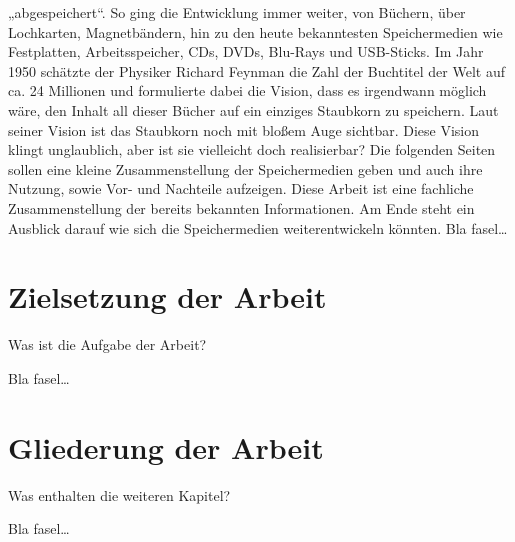 „abgespeichert“.  
So ging die Entwicklung immer weiter, von Büchern,  über Lochkarten, Magnetbändern, hin zu den heute 
bekanntesten Speichermedien wie Festplatten, Arbeitsspeicher, CDs, DVDs, Blu-Rays und USB-Sticks.  
Im Jahr 1950 schätzte der Physiker Richard Feynman die Zahl der Buchtitel der Welt auf ca. 24 Millionen und 
formulierte dabei die Vision, dass es irgendwann möglich wäre, den Inhalt all dieser Bücher auf ein einziges 
Staubkorn zu speichern. Laut seiner Vision ist das  Staubkorn noch mit bloßem Auge sichtbar. Diese Vision 
klingt unglaublich, aber ist sie vielleicht doch realisierbar? 
Die folgenden Seiten sollen eine kleine Zusammenstellung der Speichermedien geben und auch ihre Nutzung, 
sowie Vor- und Nachteile aufzeigen.  
Diese Arbeit ist eine fachliche Zusammenstellung der bereits bekannten Informationen. Am Ende steht ein 
Ausblick darauf wie sich die Speichermedien weiterentwickeln könnten.  
Bla fasel\ldots



\section{Zielsetzung der Arbeit}
\label{ch:Einleitung:sec:Zielsetzung}

Was ist die Aufgabe der Arbeit?

Bla fasel\ldots

\section{Gliederung der Arbeit}
\label{ch:Einleitung:sec:Gliederung}

Was enthalten die weiteren Kapitel?

Bla fasel\ldots

